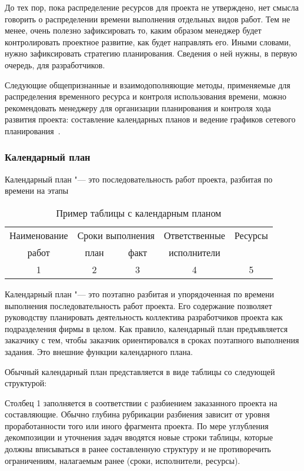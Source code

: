 \documentclass{../industrial-development}
\newcommand{\sz}{\footnotesize}
\begin{document}
До тех пор, пока распределение ресурсов для проекта не утверждено, нет смысла говорить о распределении времени выполнения отдельных видов работ. Тем не менее, очень полезно зафиксировать то, каким образом менеджер будет контролировать проектное развитие, как будет направлять его. Иными словами, нужно зафиксировать стратегию планирования. Сведения о ней нужны, в первую очередь, для разработчиков.

Следующие общепризнанные и взаимодополняющие методы, применяемые для распределения временного ресурса и контроля использования времени, можно рекомендовать менеджеру для организации планирования и контроля хода развития проекта: составление календарных планов и ведение графиков сетевого планирования~\cite[с.~48]{Skopin}.

\begin{frame} \frametitle{Календарный план}
  \begin{definition}
    Календарный план "--- это последовательность работ проекта, разбитая по времени на этапы
  \end{definition}
  \begin{table}
  \caption{Пример таблицы с календарным планом}
  \center
  \begin{tabular}{ccccc}
   \hline
   \sz Наименование & \multicolumn{2}{c}{\sz Сроки выполнения\phantom{000}} & \sz Ответственные & \sz Ресурсы \\
   \sz работ & \sz план & \sz факт & \sz исполнители &  \\
   \hline
   1 & 2 & 3 & 4 & 5 \\
   \hline
  \end{tabular}
  \end{table}
\end{frame}

\lecturenotes

Календарный план "--- это поэтапно разбитая и упорядоченная по времени выполнения последовательность работ проекта. Его содержание позволяет руководству планировать деятельность коллектива разработчиков проекта как подразделения фирмы в целом. Как правило, календарный план предъявляется заказчику с тем, чтобы заказчик ориентировался в сроках поэтапного выполнения задания. Это внешние функции календарного плана.

Обычный календарный план представляется в виде таблицы со следующей структурой:

Столбец 1 заполняется в соответствии с разбиением заказанного проекта на составляющие. Обычно глубина рубрикации разбиения зависит от уровня проработанности того или иного фрагмента проекта. По мере углубления декомпозиции и уточнения задач вводятся новые строки таблицы, которые должны вписываться в ранее составленную структуру и не противоречить ограничениям, налагаемым ранее (сроки, исполнители, ресурсы).
\end{document}
